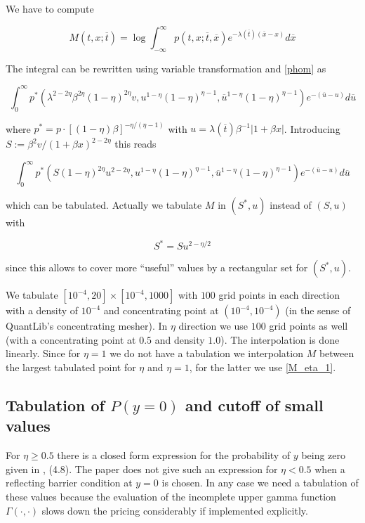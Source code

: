 \documentclass{amsart}
\theoremstyle{plain}
\numberwithin{equation}{section}
\begin{document}
We have to compute

\begin{equation}
M(t,x;\overline{t}) = \log \int_{-\infty}^{\infty} p(t,x;\overline{t},\overline{x}) e^{-\lambda(\overline{t})(\overline{x}-x)}d\overline{x}
\end{equation}

The integral can be rewritten using variable transformation and \ref{phom} as

\begin{equation}
\int_{0}^{\infty} p^* ( \lambda^{2-2\eta} \beta^{2\eta} (1-\eta)^{2\eta} v, u^{1-\eta}(1-\eta)^{\eta-1}, \overline{u}^{1-\eta}(1-\eta)^{\eta-1} ) e^{-(\overline{u}-u)} d\overline{u}
\end{equation}

where $p^*= p\cdot [(1-\eta)\beta]^{-\eta/(\eta-1)}$ with $u = \lambda(\overline{t})\beta^{-1}|1+\beta x|$. Introducing $S:=\beta^2v/(1+\beta x)^{2-2\eta}$ this reads

\begin{equation}
\int_{0}^{\infty} p^* ( S (1-\eta)^{2\eta} u^{2-2\eta}, u^{1-\eta}(1-\eta)^{\eta-1}, \overline{u}^{1-\eta}(1-\eta)^{\eta-1} ) e^{-(\overline{u}-u)} d\overline{u}
\end{equation}

which can be tabulated. Actually we tabulate $M$ in $(S^*,u)$ instead of $(S,u)$ with

\begin{equation}
S^* = S u^{2-\eta/2}
\end{equation}

since this allows to cover more ``useful'' values by a rectangular set for $(S^*,u)$.

We tabulate $[10^{-4},20] \times [10^{-4},1000]$ with $100$ grid points in each direction with a density of $10^{-4}$ and concentrating point at $(10^{-4}, 10^{-4})$ (in the sense of QuantLib's concentrating mesher). In $\eta$ direction we use $100$ grid points as well (with a concentrating point at $0.5$ and density $1.0$). The interpolation is done linearly. Since for $\eta=1$ we do not have a tabulation we interpolation $M$ between the largest tabulated point for $\eta$ and $\eta=1$, for the latter we use \ref{M_eta_1}.

\subsection{Tabulation of $P(y = 0)$ and cutoff of small values}

For $\eta \geq 0.5$ there is a closed form expression for the probability of $y$ being zero given in \cite{betaeta}, (4.8). The paper does not give such an expression for $\eta<0.5$ when a reflecting barrier condition at $y=0$ is chosen. In any case we need a tabulation of these values because the evaluation of the incomplete upper gamma function $\Gamma(\cdot,\cdot)$ slows down the pricing considerably if implemented explicitly.
\end{document}
